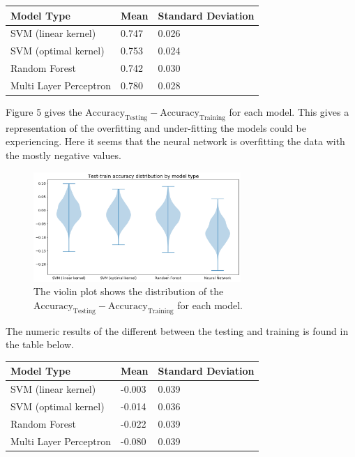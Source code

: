 \documentclass[12pt]{article}
\begin{document}
\begin{table}[H]
\centering
\begin{tabular}{l|l|l}
\hline
\multicolumn{1}{|l|}{Model Type} & Mean  & \multicolumn{1}{l|}{Standard Deviation} \\ \hline
SVM (linear kernel)              & 0.747 & 0.026                                   \\
SVM (optimal kernel)             & 0.753 & 0.024                                   \\
Random Forest                    & 0.742 & 0.030                                   \\
Multi Layer Perceptron           & 0.780 & 0.028                                  
\end{tabular}
\end{table}
Figure 5 gives the $\text{Accuracy}_{\text{Testing}} - \text{Accuracy}_{\text{Training}}$ for each model. This gives a representation of the overfitting and under-fitting the models could be experiencing. Here it seems that the neural network is overfitting the data with the mostly negative values.
\begin{figure}[H]
\centering
\includegraphics[width=0.7\textwidth]{testOut2}
\caption{The violin plot shows the distribution of the $\text{Accuracy}_{\text{Testing}} - \text{Accuracy}_{\text{Training}}$
for each model. }
\end{figure}
The numeric results of the different between the testing and training is found in the table below.

\begin{table}[H]
\centering
\begin{tabular}{l|l|l}
\hline
\multicolumn{1}{|l|}{Model Type} & Mean   & \multicolumn{1}{l|}{Standard Deviation} \\ \hline
SVM (linear kernel)              & -0.003 & 0.039                                   \\
SVM (optimal kernel)             & -0.014 & 0.036                                   \\
Random Forest                    & -0.022 & 0.039                                   \\
Multi Layer Perceptron           & -0.080 & 0.039                                  
\end{tabular}
\end{table}
\end{document}
